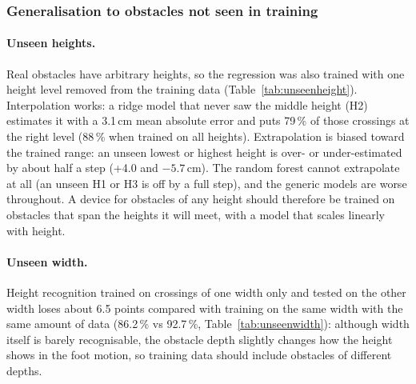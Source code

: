 \subsubsection{Generalisation to obstacles not seen in training}
\label{sec:res-general}

\paragraph{Unseen heights.} Real obstacles have arbitrary heights, so the regression was also trained with one height level removed
from the training data (Table~\ref{tab:unseenheight}). Interpolation works: a ridge model that never saw the middle height (H2)
estimates it with a 3.1\,cm mean absolute error and puts 79\,\% of those crossings at the right level (88\,\% when trained on all
heights). Extrapolation is biased toward the trained range: an unseen lowest or highest height is over- or under-estimated by about
half a step (+4.0 and $-5.7$\,cm). The random forest cannot extrapolate at all (an unseen H1 or H3 is off by a full step), and the
generic models are worse throughout. A device for obstacles of any height should therefore be trained on obstacles that span the
heights it will meet, with a model that scales linearly with height.

\begin{table}[htbp]
\centering
\caption{Height in cm when a height level is missing from training (person scaling). Cells: mean absolute error in cm (mean signed
error, + = too high); ``right level'' = the estimate is closest to the person's true nominal height.}
\label{tab:unseenheight}

\end{table}

\paragraph{Unseen width.} Height recognition trained on crossings of one width only and tested on the other width loses about
6.5 points compared with training on the same width with the same amount of data (86.2\,\% vs 92.7\,\%, Table~\ref{tab:unseenwidth}):
although width itself is barely recognisable, the obstacle depth slightly changes how the height shows in the foot motion, so
training data should include obstacles of different depths.

\begin{table}[htbp]
\centering
\caption{Height recognition tested on one width, trained on the same width, the other width only, or both (two foot IMUs, person
scaling, forest vote).}
\label{tab:unseenwidth}

\end{table}



